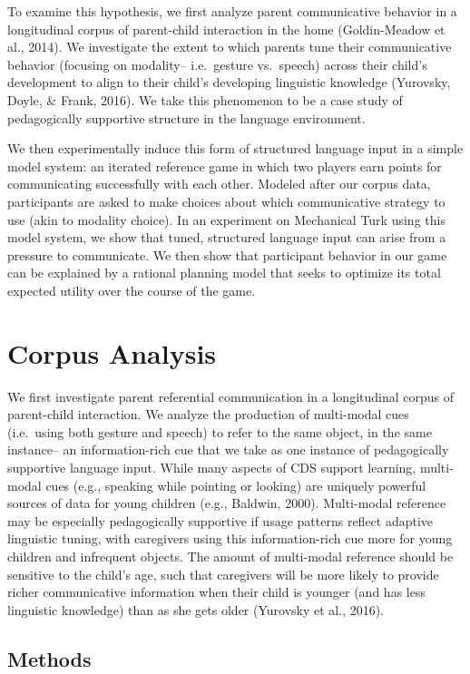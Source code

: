 \documentclass[10pt, letterpaper]{article}
\begin{document}
To examine this hypothesis, we first analyze parent communicative
behavior in a longitudinal corpus of parent-child interaction in the
home (Goldin-Meadow et al., 2014). We investigate the extent to which
parents tune their communicative behavior (focusing on modality--
i.e.~gesture vs.~speech) across their child's development to align to
their child's developing linguistic knowledge (Yurovsky, Doyle, \&
Frank, 2016). We take this phenomenon to be a case study of
pedagogically supportive structure in the language environment.

We then experimentally induce this form of structured language input in
a simple model system: an iterated reference game in which two players
earn points for communicating successfully with each other. Modeled
after our corpus data, participants are asked to make choices about
which communicative strategy to use (akin to modality choice). In an
experiment on Mechanical Turk using this model system, we show that
tuned, structured language input can arise from a pressure to
communicate. We then show that participant behavior in our game can be
explained by a rational planning model that seeks to optimize its total
expected utility over the course of the game.

\section{Corpus Analysis}\label{corpus-analysis}

We first investigate parent referential communication in a longitudinal
corpus of parent-child interaction. We analyze the production of
multi-modal cues (i.e.~using both gesture and speech) to refer to the
same object, in the same instance-- an information-rich cue that we take
as one instance of pedagogically supportive language input. While many
aspects of CDS support learning, multi-modal cues (e.g., speaking while
pointing or looking) are uniquely powerful sources of data for young
children (e.g., Baldwin, 2000). Multi-modal reference may be especially
pedagogically supportive if usage patterns reflect adaptive linguistic
tuning, with caregivers using this information-rich cue more for young
children and infrequent objects. The amount of multi-modal reference
should be sensitive to the child's age, such that caregivers will be
more likely to provide richer communicative information when their child
is younger (and has less linguistic knowledge) than as she gets older
(Yurovsky et al., 2016).

\subsection{Methods}\label{methods}
\end{document}

